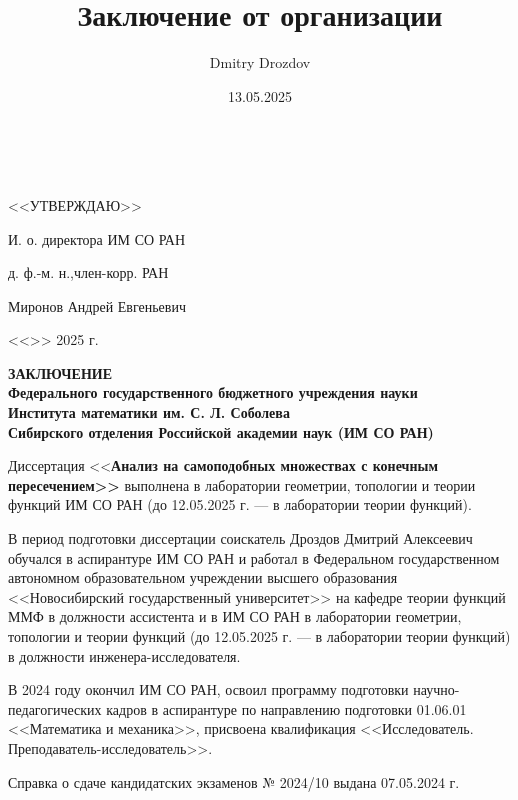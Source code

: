 \documentclass[14pt, a4paper]{extarticle}
\title{Заключение от организации}
\author{Dmitry Drozdov}
\date{13.05.2025}
\begin{document}
\;\\
\vspace{1cm}

\noindent\hspace{7cm}<<УТВЕРЖДАЮ>>\par
\noindent\hspace{7cm}И. о. директора ИМ СО РАН\par
\noindent\hspace{7cm}д. ф.-м. н.,член-корр. РАН\par
\vspace{1cm}
\noindent\hspace{7cm}Миронов Андрей Евгеньевич\par
\noindent\hspace{7cm}<<\underline{\hspace{1cm}}>>\underline{\hspace{3cm}} 2025 г.\\

\vspace{3.5cm}

\begin{center}\bf
ЗАКЛЮЧЕНИЕ\\
Федерального государственного бюджетного учреждения науки\\
Института математики им. С. Л. Соболева\\
Сибирского отделения Российской академии наук (ИМ СО РАН) 
\end{center}



Диссертация {<<\bf Анализ на самоподобных множествах с конечным пересечением>>} выполнена в лаборатории геометрии, топологии и теории функций ИМ СО РАН (до 12.05.2025 г. --- в лаборатории теории функций).

В период подготовки диссертации соискатель Дроздов Дмитрий Алексеевич обучался в аспирантуре ИМ СО РАН и работал в  Федеральном государственном автономном образовательном учреждении высшего образования <<Новосибирский государственный университет>> на кафедре теории функций ММФ в должности ассистента и в ИМ СО РАН в лаборатории геометрии, топологии и теории функций (до 12.05.2025 г. --- в лаборатории теории функций) в должности инженера-исследователя.

В 2024 году окончил ИМ СО РАН, освоил программу подготовки научно-педагогических кадров в аспирантуре по направлению подготовки 01.06.01 <<Математика и механика>>, присвоена квалификация <<Исследователь. Пре\-по\-да\-ватель-исследователь>>.

Справка о сдаче кандидатских экзаменов № 2024/10 выдана 07.05.2024 г. 
\end{document}
